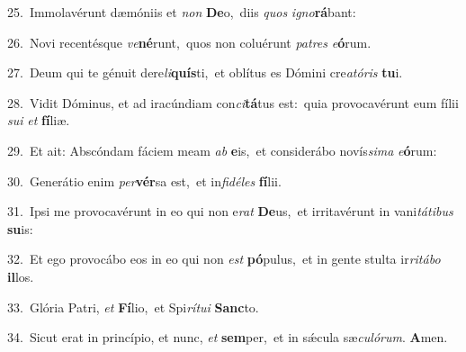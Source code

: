 {\numbfont\textcolor{\numbcolor}{25.}}~Immolavérunt dæmóniis et \textit{non} \textbf{De}\-o,~\star diis \textit{quos} \textit{i}\-\textit{gno}\textbf{rá}bant:\par
{\numbfont\textcolor{\numbcolor}{26.}}~Novi recentésque \textit{ve}\-\textbf{né}runt,~\star quos non coluérunt \textit{pa}\-\textit{tres} \textit{e}\-\textbf{ó}rum.\par
{\numbfont\textcolor{\numbcolor}{27.}}~Deum qui te génuit dere\-\textit{li}\-\textbf{quís}ti,~\star et oblítus es Dómini cre\-\textit{a}\-\textit{tó}\textit{ris} \textbf{tu}\-i.\par
{\numbfont\textcolor{\numbcolor}{28.}}~Vidit Dóminus, et ad iracúndiam con\-\textit{ci}\-\textbf{tá}tus est:~\star quia provocavérunt eum fílii \textit{su}\-\textit{i} \textit{et} \textbf{fí}\-liæ.\par
{\numbfont\textcolor{\numbcolor}{29.}}~Et ait: Abscóndam fáciem meam \textit{ab} \textbf{e}\-is,~\star et considerábo novís\-\textit{si}\-\textit{ma} \textit{e}\-\textbf{ó}rum:\par
{\numbfont\textcolor{\numbcolor}{30.}}~Generátio enim \textit{per}\-\textbf{vér}sa est,~\star et in\-\textit{fi}\-\textit{dé}\textit{les} \textbf{fí}\-lii.\par
{\numbfont\textcolor{\numbcolor}{31.}}~Ipsi me provocavérunt in eo qui non e\textit{rat} \textbf{De}\-us,~\star et irritavérunt in vani\-\textit{tá}\-\textit{ti}\textit{bus} \textbf{su}\-is:\par
{\numbfont\textcolor{\numbcolor}{32.}}~Et ego provocábo eos in eo qui non \textit{est} \textbf{pó}\-pulus,~\star et in gente stulta ir\-\textit{ri}\-\textit{tá}\textit{bo} \textbf{il}\-los.\par
{\numbfont\textcolor{\numbcolor}{33.}}~Glória Patri, \textit{et} \textbf{Fí}\-lio,~\star et Spi\-\textit{rí}\-\textit{tu}\textit{i} \textbf{Sanc}\-to.\par
{\numbfont\textcolor{\numbcolor}{34.}}~Sicut erat in princípio, et nunc, \textit{et} \textbf{sem}\-per,~\star et in sǽcula sæ\-\textit{cu}\-\textit{ló}\textit{rum}. \textbf{A}\-men.\par
